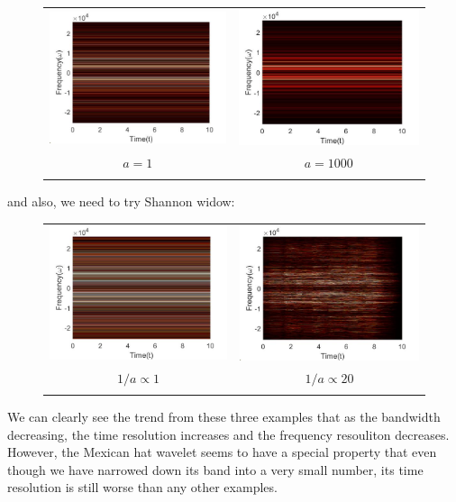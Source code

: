 \documentclass[12pt]{article}
\begin{document}
\begin{figure}[H]
\begin{tabular}{cc}
  \includegraphics[width=65mm]{m1.jpg} &    \includegraphics[width=65mm]{m4.jpg} \\
 $a=1$ &  $a=1000$ \\[6pt]\\
\end{tabular}
\end{figure}
and also, we need to try Shannon widow:
\begin{figure}[H]
\begin{tabular}{cc}
  \includegraphics[width=65mm]{h4.jpg} &    \includegraphics[width=65mm]{h1.jpg} \\
 $1/a \propto 1$ &  $1/a \propto 20$ \\[6pt]\\
\end{tabular}
\end{figure}
We can clearly see the trend from these three examples that as the bandwidth decreasing, the time resolution increases and the frequency resouliton decreases. However, the Mexican hat wavelet seems to have a special property that even though we have narrowed down its band into a very small number, its time resolution is still worse than any other examples.
\end{document}
